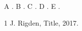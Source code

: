 \documentclass{article}
\begin{document}
A \cite{k}. B \cite[p.~5]{k}. C \cite[]{k}. D \cite[][]{k}. E \cite[see][]{k}.
\begin{thebibliography}{1}
 J. Rigden, Title, 2017.
\end{thebibliography}
\end{document}
